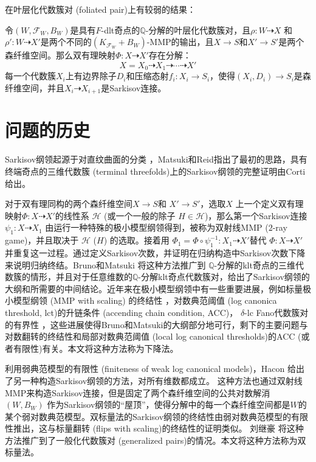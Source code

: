 在叶层化代数簇对 (foliated pair)上有较弱的结果：
\begin{theorem}[弱Sarkisov分解]\label{mainf}
  令$(W,\mathcal{F}_{W},B_{W})$是具有$F$-dlt奇点的$\mathbb{Q}$-分解的叶层化代数簇对，且$\rho:W\dashrightarrow X$ 和$\rho':W \dashrightarrow X'$是两个不同的$(K_{\mathcal{F}_{W}}+B_{W})$-MMP的输出，且$X \to S$和$X' \to S'$是两个森纤维空间。那么双有理映射$\Phi:X \dashrightarrow X'$存在分解：
  \[ X=X_{0}\dashrightarrow X_{1}\dashrightarrow \cdots \dashrightarrow X' \]
  每一个代数簇$X_{i}$上有边界除子$D_{i}$和压缩态射$f_{i}:X_{i}\to S_{i}$，使得$(X_{i},D_{i})\to S_{i}$是森纤维空间，并且$X_{i} \dashrightarrow X_{i+1}$是Sarkisov连接。
\end{theorem}

\section{问题的历史}
Sarkisov纲领起源于对直纹曲面的分类 \cite{sarkisovBIRATIONALAUTOMORPHISMSCONIC1981,sarkisovCONICBUNDLESTRUCTURES1983}，Matsuki和Reid指出了最初的思路，具有终端奇点的三维代数簇 (terminal threefolds)上的Sarkisov纲领的完整证明由Corti\cite{cortiFactoringBirationalMaps}给出。 

对于双有理同构的两个森纤维空间$X\to S$和 $X'\to S'$，选取$X$ 上一个定义双有理映射$\Phi:X \dashrightarrow X'$的线性系 $\mathcal{H}$ (或一个一般的除子 $H \in \mathcal{H}$)，那么第一个Sarkisov连接 $\psi_1:X\dashrightarrow X_1$ 由运行一种特殊的极小模型纲领得到，被称为双射线MMP ($2$-ray game)，并且取决于 $\mathcal{H}$ ($H$) 的选取。接着用 $\Phi_{1}=\Phi\circ \psi_1^{-1}: X_1 \dashrightarrow X'$替代 $\Phi:X\dashrightarrow X'$并重复这一过程。通过定义Sarkisov次数，并证明在归纳构造中Sarkisov次数下降来说明归纳终结。Bruno和Matsuki \cite{brunoLogSarkisovProgram1995} 将这种方法推广到 $\mathbb{Q}$-分解的klt奇点的三维代数簇的情形，并且对于任意维数的$\mathbb{Q}$-分解klt奇点代数簇对，给出了Sarkisov纲领的大纲和所需要的中间结论。近年来在极小模型纲领中有一些重要进展，例如标量极小模型纲领 (MMP with scaling) 的终结性 \cite{BCHM10}，对数典范阈值 (log canonica threshold, lct)的升链条件 (accending chain condition, ACC)\cite{HMX14}， $\delta$-lc Fano代数簇对的有界性 \cite{Bir19,birkarSingularitiesLinearSystems2020}，这些进展使得Bruno和Matsuki的大纲部分地可行，剩下的主要问题与对数翻转的终结性和局部对数典范阈值 (local log canonical thresholds)的ACC (或者有限性)有关。本文将这种方法称为下降法。


利用弱典范模型的有限性\cite{BCHM10} (finiteness of weak log canonical models)，Hacon \cite{haconMinimalModelProgram2012} 给出了另一种构造Sarkisov纲领的方法，对所有维数都成立。
这种方法也通过双射线MMP来构造Sarkisov连接，但是固定了两个森纤维空间的公共对数解消 $(W,B_W)$ 作为Sarkisov纲领的``屋顶''，使得分解中的每一个森纤维空间都是$W$的某个弱对数典范模型。双标量法的Sarkisov纲领的终结性由弱对数典范模型的有限性推出，这与标量翻转 (flips with scaling)的终结性的证明类似。
刘继豪 \cite{liuSarkisovProgramGeneralized2021} 将这种方法推广到了一般化代数簇对 (generalized pairs)的情况。本文将这种方法称为双标量法。


